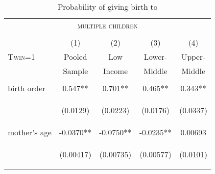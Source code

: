 \documentclass{article}[11pt,subeqn]
\begin{document}
\begin{spacing}{1.5}
\begin{table}[htpb!]
\caption{Probability of giving birth to}
\vspace{-7mm}
\label{tab:twinreg1}
\begin{center}
\begin{tabular}{lcccc} 
\multicolumn{5}{c}{\textsc{multiple children}}\\
& & \\
\toprule
 & (1) & (2) & (3) & (4) \\
\textsc{Twin=1} & Pooled & Low & Lower- & Upper- \\ 
 & Sample & Income & Middle & Middle \\  \midrule
\vspace{4pt} & \begin{footnotesize}\end{footnotesize} & \begin{footnotesize}\end{footnotesize} & \begin{footnotesize}\end{footnotesize} & \begin{footnotesize}\end{footnotesize} \\
birth order & 0.547** & 0.701** & 0.465** & 0.343** \\
\vspace{4pt} & \begin{footnotesize}(0.0129)\end{footnotesize} & \begin{footnotesize}(0.0223)\end{footnotesize} & \begin{footnotesize}(0.0176)\end{footnotesize} & \begin{footnotesize}(0.0337)\end{footnotesize} \\
mother's age & -0.0370** & -0.0750** & -0.0235** & 0.00693 \\
\vspace{4pt} & \begin{footnotesize}(0.00417)\end{footnotesize} & \begin{footnotesize}(0.00735)\end{footnotesize} & \begin{footnotesize}(0.00577)\end{footnotesize} & \begin{footnotesize}(0.0101)\end{footnotesize} \\

\end{tabular}
\end{center}
\end{table}
\end{spacing}
\end{document}
